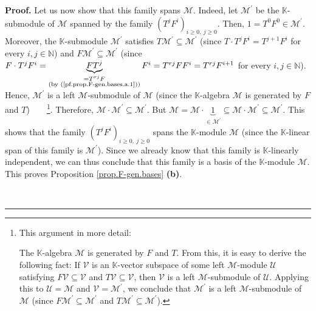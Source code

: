 \documentclass[numbers=enddot,12pt,final,onecolumn,notitlepage]{scrartcl}%
\theoremstyle{definition}
\newenvironment{proof}[1][Proof]{\noindent\textbf{#1.} }{\ \rule{0.5em}{0.5em}}
\begin{document}
\begin{proof}
Let us now show that this family spans $\mathcal{M}$. Indeed, let
$\mathcal{M}^{\prime}$ be the $\mathbb{K}$-submodule of $\mathcal{M}$ spanned
by the family $\left(  T^{j}F^{i}\right)  _{i\geq0,\ j\geq0}$. Then,
$1=T^{0}F^{0}\in\mathcal{M}^{\prime}$. Moreover, the $\mathbb{K}$-submodule
$\mathcal{M}^{\prime}$ satisfies $T\mathcal{M}^{\prime}\subseteq
\mathcal{M}^{\prime}$ (since $T\cdot T^{j}F^{i}=T^{j+1}F^{i}$ for every
$i,j\in\mathbb{N}$) and $F\mathcal{M}^{\prime}\subseteq\mathcal{M}^{\prime}$
(since $F\cdot T^{j}F^{i}=\underbrace{FT^{j}}_{\substack{=T^{rj}F\\\text{(by
(\ref{pf.prop.F-gen.bases.a.1}))}}}F^{i}=T^{rj}FF^{i}=T^{rj}F^{i+1}$ for every
$i,j\in\mathbb{N}$). Hence, $\mathcal{M}^{\prime}$ is a left $\mathcal{M}%
$-submodule of $\mathcal{M}$ (since the $\mathbb{K}$-algebra $\mathcal{M}$ is
generated by $F$ and $T$)\ \ \ \ \footnote{This argument in more detail:
\par
The $\mathbb{K}$-algebra $\mathcal{M}$ is generated by $F$ and $T$. From this,
it is easy to derive the following fact: If $\mathcal{V}$ is an $\mathbb{K}%
$-vector subspace of some left $\mathcal{M}$-module $\mathcal{U}$ satisfying
$F\mathcal{V}\subseteq\mathcal{V}$ and $T\mathcal{V}\subseteq\mathcal{V}$,
then $\mathcal{V}$ is a left $\mathcal{M}$-submodule of $\mathcal{U}$.
Applying this to $\mathcal{U}=\mathcal{M}$ and $\mathcal{V}=\mathcal{M}%
^{\prime}$, we conclude that $\mathcal{M}^{\prime}$ is a left $\mathcal{M}%
$-submodule of $\mathcal{M}$ (since $F\mathcal{M}^{\prime}\subseteq
\mathcal{M}^{\prime}$ and $T\mathcal{M}^{\prime}\subseteq\mathcal{M}^{\prime}%
$).}. Therefore, $\mathcal{M}\cdot\mathcal{M}^{\prime}\subseteq\mathcal{M}%
^{\prime}$. But $\mathcal{M}=\mathcal{M}\cdot\underbrace{1}_{\in
\mathcal{M}^{\prime}}\subseteq\mathcal{M}\cdot\mathcal{M}^{\prime}%
\subseteq\mathcal{M}^{\prime}$. This shows that the family $\left(  T^{j}%
F^{i}\right)  _{i\geq0,\ j\geq0}$ spans the $\mathbb{K}$-module $\mathcal{M}$
(since the $\mathbb{K}$-linear span of this family is $\mathcal{M}^{\prime}$).
Since we already know that this family is $\mathbb{K}$-linearly independent,
we can thus conclude that this family is a basis of the $\mathbb{K}$-module
$\mathcal{M}$. This proves Proposition \ref{prop.F-gen.bases} \textbf{(b)}.


\end{proof}
\end{document}
